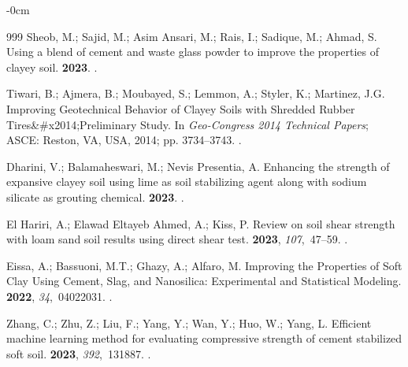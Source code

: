 \documentclass[algorithms,article,accept,pdftex,moreauthors]{Definitions/mdpi}
\begin{document}
\begin{adjustwidth}{-\extralength}{0cm}
\begin{thebibliography}{999}
Sheob, M.; Sajid, M.; {Asim Ansari}, M.; Rais, I.; Sadique, M.; Ahmad, S.
\newblock Using a blend of cement and waste glass powder to improve the
  properties of clayey soil.
 {\bf 2023}.
.

Tiwari, B.; Ajmera, B.; Moubayed, S.; Lemmon, A.; Styler, K.; Martinez, J.G.
  Improving Geotechnical Behavior of Clayey Soils with Shredded Rubber
  Tires\&\#x2014;Preliminary Study.
\newblock In {\em Geo-Congress 2014 Technical Papers}; ASCE: Reston, VA, USA, 2014; pp. %
  3734--3743.
.

Dharini, V.; Balamaheswari, M.; {Nevis Presentia}, A.
\newblock Enhancing the strength of expansive clayey soil using lime as soil
  stabilizing agent along with sodium silicate as grouting chemical.
 {\bf 2023}.
.

{El Hariri}, A.; {Elawad Eltayeb Ahmed}, A.; Kiss, P.
\newblock Review on soil shear strength with loam sand soil results using
  direct shear test.
 {\bf 2023}, {\em 107},~47--59.
.

Eissa, A.; Bassuoni, M.T.; Ghazy, A.; Alfaro, M.
\newblock Improving the Properties of Soft Clay Using Cement, Slag, and
  Nanosilica: Experimental and Statistical Modeling.
 {\bf 2022}, {\em
  34},~04022031.
.

Zhang, C.; Zhu, Z.; Liu, F.; Yang, Y.; Wan, Y.; Huo, W.; Yang, L.
\newblock Efficient machine learning method for evaluating compressive strength
  of cement stabilized soft soil.
 {\bf 2023}, {\em
  392},~131887.
.


\end{thebibliography}
\end{adjustwidth}
\end{document}
